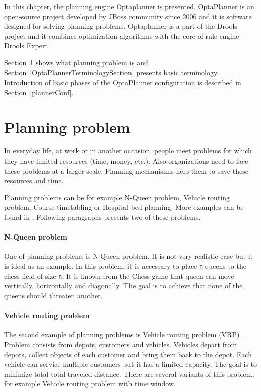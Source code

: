 In this chapter, the planning engine Optaplanner is presented. OptaPlanner \cite{OptaPlannerPages, DroolsBook} is an open-source project developed by JBoss community since 2006 and it is software designed for solving planning problems. Optaplanner is a part of the Drools project \cite{Drools} and it combines optimization algorithms with the core of rule engine -- Drools Expert \cite{Drools}.

Section~\ref{planningProblem} shows what planning problem is and Section~\ref{OptaPlannerTerminologySection} presents
basic terminology. Introduction of basic phases of the OptaPlanner configuration is described in
Section~\ref{plannerConf}.

\section{Planning problem}\label{planningProblem}
In everyday life, at work or in another occasion, people meet problems for which they have limited resources (time,
money, etc.). Also organizations need to face these problems at a larger scale. Planning mechanisims help them to save
these resources and time.

Planning problems can be for example N-Queen problem, Vehicle routing problem, Course timetabling or Hospital bed
planning. More examples can be found in \cite{OptaPlannerDoc}. Following paragraphs presents two of these problems.

\paragraph{N-Queen problem}
One of planning problems is N-Queen problem. It is not very realistic case but it is ideal as an example. In this problem, it is necessary to place \texttt{n} queens to the chess field of size \texttt{n}. It is known from the Chess game that queen can move vertically, horizontally and diagonally. The goal is to achieve that none of the queens should threaten another.

\paragraph{Vehicle routing problem}
The second example of planning problems is Vehicle routing problem (VRP)~\cite{VehicleRouting}. Problem consists from
depots, customers and vehicles. Vehicles depart from depots, collect objects of each customer and bring them back to
the depot. Each vehicle can service multiple customers but it has a limited capacity. The goal is to minimize total
total traveled distance. There are several variants of this problem, for example Vehicle routing problem with time
window.

